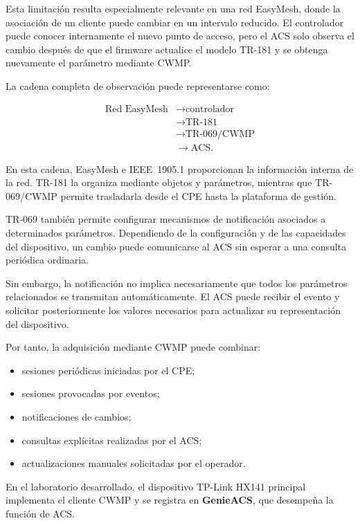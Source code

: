 Esta limitación resulta especialmente relevante en una red EasyMesh,
donde la asociación de un cliente puede cambiar en un intervalo reducido.
El controlador puede conocer internamente el nuevo punto de acceso, pero
el ACS solo observa el cambio después de que el firmware actualice el
modelo TR-181 y se obtenga nuevamente el parámetro mediante CWMP.

La cadena completa de observación puede representarse como:

\[
\begin{aligned}
    \text{Red EasyMesh}
    &\longrightarrow
    \text{controlador}\\
    &\longrightarrow
    \text{TR-181}\\
    &\longrightarrow
    \text{TR-069/CWMP}\\
    &\longrightarrow
    \text{ACS}.
\end{aligned}
\]

En esta cadena, EasyMesh e IEEE~1905.1 proporcionan la información
interna de la red. TR-181 la organiza mediante objetos y parámetros,
mientras que TR-069/CWMP permite trasladarla desde el CPE hasta la
plataforma de gestión.

TR-069 también permite configurar mecanismos de notificación asociados a
determinados parámetros. Dependiendo de la configuración y de las
capacidades del dispositivo, un cambio puede comunicarse al ACS sin
esperar a una consulta periódica ordinaria.

Sin embargo, la notificación no implica necesariamente que todos los
parámetros relacionados se transmitan automáticamente. El ACS puede
recibir el evento y solicitar posteriormente los valores necesarios para
actualizar su representación del dispositivo.

Por tanto, la adquisición mediante CWMP puede combinar:

\begin{itemize}
    \item sesiones periódicas iniciadas por el CPE;
    \item sesiones provocadas por eventos;
    \item notificaciones de cambios;
    \item consultas explícitas realizadas por el ACS;
    \item actualizaciones manuales solicitadas por el operador.
\end{itemize}

En el laboratorio desarrollado, el dispositivo TP-Link HX141 principal
implementa el cliente CWMP y se registra en
\textbf{GenieACS}, que desempeña la función de ACS.

